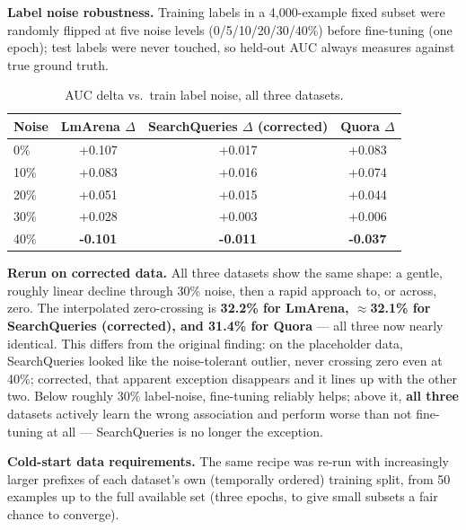\documentclass[11pt]{article}
\newenvironment{fittab}{\begin{lrbox}{\fittabbox}}{\end{lrbox}%
  \ifdim\wd\fittabbox>\linewidth\resizebox{\linewidth}{!}{\usebox{\fittabbox}}\else\usebox{\fittabbox}\fi}
\begin{document}
\textbf{Label noise robustness.} Training labels in a 4,000-example fixed subset were randomly flipped at five noise levels (0/5/10/20/30/40\%) before fine-tuning (one epoch); test labels were never touched, so held-out AUC always measures against true ground truth.

\begin{table}[h]
\centering
\small
\begin{fittab}\begin{tabular}{@{}lccc@{}}
\toprule
\textbf{Noise} & \textbf{LmArena $\Delta$} & \textbf{SearchQueries $\Delta$ (corrected)} & \textbf{Quora $\Delta$} \\
\midrule
0\% & +0.107 & +0.017 & +0.083 \\
10\% & +0.083 & +0.016 & +0.074 \\
20\% & +0.051 & +0.015 & +0.044 \\
30\% & +0.028 & +0.003 & +0.006 \\
40\% & \textbf{-0.101} & \textbf{-0.011} & \textbf{-0.037} \\
\bottomrule
\end{tabular}\end{fittab}
\caption{AUC delta vs.\ train label noise, all three datasets.}
\end{table}

\textbf{Rerun on corrected data.} All three datasets show the same shape: a gentle, roughly linear decline through 30\% noise, then a rapid approach to, or across, zero. The interpolated zero-crossing is \textbf{32.2\% for LmArena, $\approx$32.1\% for SearchQueries (corrected), and 31.4\% for Quora} --- all three now nearly identical. This differs from the original finding: on the placeholder data, SearchQueries looked like the noise-tolerant outlier, never crossing zero even at 40\%; corrected, that apparent exception disappears and it lines up with the other two. Below roughly 30\% label-noise, fine-tuning reliably helps; above it, \textbf{all three} datasets actively learn the wrong association and perform worse than not fine-tuning at all --- SearchQueries is no longer the exception.

\textbf{Cold-start data requirements.} The same recipe was re-run with increasingly larger prefixes of each dataset's own (temporally ordered) training split, from 50 examples up to the full available set (three epochs, to give small subsets a fair chance to converge).
\end{document}
